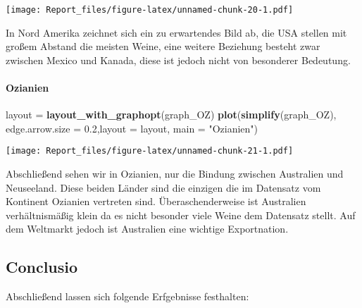 \documentclass[
]{article}
\newenvironment{Shaded}{\begin{snugshade}}{\end{snugshade}}
\newcommand{\AttributeTok}[1]{\textcolor[rgb]{0.13,0.29,0.53}{#1}}
\newcommand{\FloatTok}[1]{\textcolor[rgb]{0.00,0.00,0.81}{#1}}
\newcommand{\FunctionTok}[1]{\textcolor[rgb]{0.13,0.29,0.53}{\textbf{#1}}}
\newcommand{\NormalTok}[1]{#1}
\newcommand{\OtherTok}[1]{\textcolor[rgb]{0.56,0.35,0.01}{#1}}
\newcommand{\StringTok}[1]{\textcolor[rgb]{0.31,0.60,0.02}{#1}}
\begin{document}
\texttt{[image: Report\_files/figure-latex/unnamed-chunk-20-1.pdf]}

In Nord Amerika zeichnet sich ein zu erwartendes Bild ab, die USA
stellen mit großem Abstand die meisten Weine, eine weitere Beziehung
besteht zwar zwischen Mexico und Kanada, diese ist jedoch nicht von
besonderer Bedeutung.

\paragraph{Ozianien}\label{ozianien}

\begin{Shaded}
\begin{Highlighting}[]
\NormalTok{layout }\OtherTok{=} \FunctionTok{layout\_with\_graphopt}\NormalTok{(graph\_OZ)}
\FunctionTok{plot}\NormalTok{(}\FunctionTok{simplify}\NormalTok{(graph\_OZ), }\AttributeTok{edge.arrow.size =} \FloatTok{0.2}\NormalTok{,}\AttributeTok{layout =}\NormalTok{ layout, }\AttributeTok{main =} \StringTok{"Ozianien"}\NormalTok{)}
\end{Highlighting}
\end{Shaded}

\texttt{[image: Report\_files/figure-latex/unnamed-chunk-21-1.pdf]}

Abschließend sehen wir in Ozianien, nur die Bindung zwischen Australien
und Neuseeland. Diese beiden Länder sind die einzigen die im Datensatz
vom Kontinent Ozianien vertreten sind. Überaschenderweise ist Australien
verhältnismäßig klein da es nicht besonder viele Weine dem Datensatz
stellt. Auf dem Weltmarkt jedoch ist Australien eine wichtige
Exportnation.

\subsection{Conclusio}\label{conclusio}

Abschließend lassen sich folgende Erfgebnisse festhalten:
\end{document}
